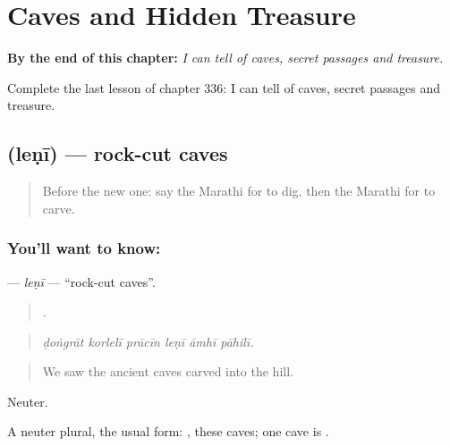 
\chapter{Caves and Hidden Treasure}
\label{ch:mr-caves-and-hidden-treasure}

\begin{chapteropening}
\textbf{By the end of this chapter:} \emph{I can tell of caves, secret passages and treasure.}

Complete the last lesson of chapter 336: I can tell of caves, secret passages and treasure.
\end{chapteropening}

\section[\texorpdfstring{\mr{लेणी} (leṇī)}{लेणी (leṇī)}]{ (leṇī) — rock-cut caves}

\label{lesson:MR-C336-leni}



\begin{quote}
Before the new one: say the Marathi for to dig, then the Marathi for to carve.
\end{quote}

\subsection*{You'll want to know: }
\textbf{} — \emph{leṇī} — \textquotedblleft{}rock-cut caves\textquotedblright{}.

\begin{quote}
     .
\end{quote}

\begin{quote}
\emph{ḍoṅgrāt korlelī prācīn leṇī āmhī pāhilī.}
\end{quote}

\begin{quote}
We saw the ancient caves carved into the hill.
\end{quote}

Neuter.

A neuter plural, the usual form:  , these caves; one cave is .

